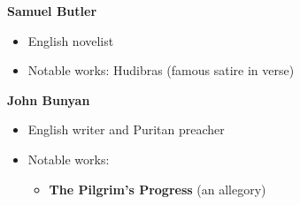 \documentclass[
  12pt,
    progressbar=frametitle]{beamer}
\providecommand{\tightlist}{%
  \setlength{\itemsep}{0pt}\setlength{\parskip}{0pt}}
\begin{document}
\begin{frame}[allowframebreaks]
\vspace{15mm}
\large\textbf{Samuel Butler}\normalsize\vspace{-3mm}

\begin{itemize}
\tightlist
\item
  English novelist
\item
  Notable works: Hudibras (famous satire in verse)
\end{itemize}

\large\textbf{John Bunyan}\normalsize\vspace{-3mm}

\begin{itemize}
\tightlist
\item
  English writer and Puritan preacher
\item
  Notable works:

  \begin{itemize}
  \tightlist
  \item
    \textbf{The Pilgrim's Progress} (an allegory)
  \end{itemize}
\end{itemize}
\end{frame}
\end{document}
